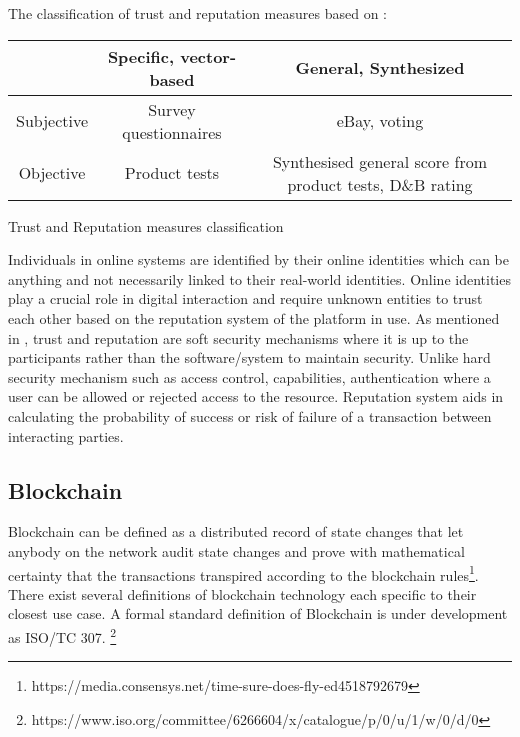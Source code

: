 The classification of trust and reputation measures based on 
 \cite{ josang2007survey}: 
\begin{center}
	\begin{tabularx}{\textwidth }{|c| c| c| }
		\hline
		 & Specific, vector-based & General, Synthesized \\
		 \hline
		Subjective & Survey questionnaires & eBay, voting \\
		\hline
		Objective & Product tests & Synthesised general score from product tests, D\&B rating 
		\hline
	\end{tabularx}
	\caption{Trust and Reputation measures classification}
\end{center}
Individuals in online systems are identified by their online identities which
can be anything and not necessarily linked to their real-world identities.
Online identities play a crucial role in digital interaction and require
unknown entities to trust each other based on the reputation system of the
platform in use. As mentioned in \cite{rasmusson1996simulated}, trust and
reputation are soft security mechanisms where it is up to the participants
rather than the software/system to maintain security. Unlike hard security
mechanism such as access control, capabilities, authentication where a user can
be allowed or rejected access to the resource. Reputation system aids in
calculating the probability of success or risk of failure of a transaction
between interacting parties.\cite{mui2002notions}\cite{carbone2003formal} 


\subsection{Blockchain}
Blockchain can be defined as a distributed record of state changes that let
anybody on the network audit state changes and prove with mathematical
certainty that the transactions transpired according to the blockchain
rules\footnote{https://media.consensys.net/time-sure-does-fly-ed4518792679}.
There exist several definitions of blockchain technology each specific to their
closest use case. A formal standard definition of Blockchain is under
development as ISO/TC 307.
\footnote{https://www.iso.org/committee/6266604/x/catalogue/p/0/u/1/w/0/d/0} \\

